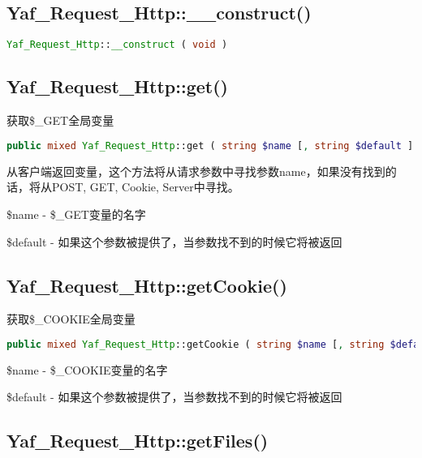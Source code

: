 \subsection{Yaf\_Request\_Http::\_\_construct()}


\begin{lstlisting}[language=PHP]
Yaf_Request_Http::__construct ( void )
\end{lstlisting}

\subsection{Yaf\_Request\_Http::get()}

获取\$\_GET全局变量

\begin{lstlisting}[language=PHP]
public mixed Yaf_Request_Http::get ( string $name [, string $default ] )
\end{lstlisting}


从客户端返回变量，这个方法将从请求参数中寻找参数name，如果没有找到的话，将从POST, GET, Cookie, Server中寻找。

\begin{compactitem}
\item \$name - \$\_GET变量的名字
\item \$default - 如果这个参数被提供了，当参数找不到的时候它将被返回
\end{compactitem}

\subsection{Yaf\_Request\_Http::getCookie()}

获取\$\_COOKIE全局变量

\begin{lstlisting}[language=PHP]
public mixed Yaf_Request_Http::getCookie ( string $name [, string $default ] )
\end{lstlisting}

\begin{compactitem}
\item \$name - \$\_COOKIE变量的名字
\item \$default - 如果这个参数被提供了，当参数找不到的时候它将被返回
\end{compactitem}

\subsection{Yaf\_Request\_Http::getFiles()}

